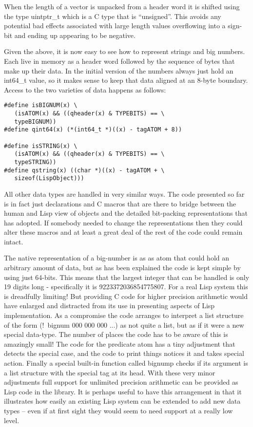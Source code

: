 When the length of a vector is unpacked from a header word it is shifted
using the type {\tx uintptr\_t} which is a C type that is  ``unsigned''. This
avoids any potential bad effects associated with large length values
overflowing into a sign-bit and ending up appearing to be negative.

Given the above, it is now easy to see how to represent strings and big
numbers. Each live in memory as a header word followed by the sequence
of bytes that make up their data. In the initial version of \vsl{} the
numbers always just hold an {\tx int64\_t} value, so it makes sense to
keep that data aligned at an 8-byte boundary. Access to the two varieties
of data happens as follows:
{\small\begin{verbatim}
#define isBIGNUM(x) \
   (isATOM(x) && ((qheader(x) & TYPEBITS) == \
   typeBIGNUM))
#define qint64(x) (*(int64_t *)((x) - tagATOM + 8))

#define isSTRING(x) \
   (isATOM(x) && ((qheader(x) & TYPEBITS) == \
   typeSTRING))
#define qstring(x) ((char *)((x) - tagATOM + \
   sizeof(LispObject)))
\end{verbatim}}

All other data types are handled in very similar ways. The code presented
so far is in fact just declarations and C macros that are there to bridge
between the human and Lisp view of objects and the detailed bit-packing
representations that \vsl{} has adopted. If somebody needed to change the
representations then they could alter these macros and at least a great
deal of the rest of the \vsl{} code could remain intact.

The native \vsl{} representation of a big-number is as as atom that could
hold an arbitrary amount of data, but as has been explained the code is
kept simple by using just 64-bits. This means that the largest integer
that can be handled is only 19 digits long - specifically it
is 9223372036854775807. For a real Lisp system this is dreadfully
limiting! But providing C code for higher precision arithmetic would
have enlarged \vsl{} and distracted from its use in presenting aspects
of Lisp implementation. As a compromise the code arranges to interpret
a list structure of the form {\tx (!~bignum 000 000 000 ...)} as not quite
a list, but as if it were a new special data-type. The number of places
the code has to be aware of this is amazingly small! The code for the
predicate {\tx atom} has a tiny adjustment that detects the special case,
and the code to print things notices it and takes special action. Finally a
special built-in function called {\tx bignump} checks if its argument is
a list structure with the special tag at its head. With these very minor
adjustments full support for unlimited precision arithmetic can be provided
as Lisp code in the \vsl{} library. It is perhaps useful to have this
arrangement in that it illustrates how easily an existing Lisp system can be
extended to add new data types -- even if at first sight they would seem
to need support at a really low level.

